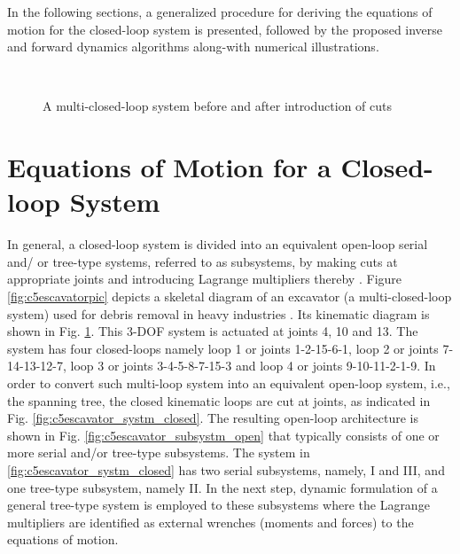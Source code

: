 In the following sections, a generalized procedure for deriving the equations of motion for the closed-loop system is presented, followed by the proposed inverse and forward dynamics algorithms along-with numerical illustrations.
\begin{figure}[t]
	\begin{center}
		\\ 
		 \hspace{1.5pt}
	\end{center}
	\caption{A multi-closed-loop system before and after introduction of cuts}
	\label{fig:c5cut_strategy}
\end{figure}
\section{Equations of Motion for a Closed-loop System}
\label{c5EOM}
In general, a closed-loop system is divided into an equivalent open-loop serial and/ or tree-type systems, referred to as subsystems, by making cuts at appropriate joints and introducing Lagrange multipliers thereby \citep{bae1987recursive,nikravesh1993systematic,blajer1994projective,shabana2013dynamics}. Figure \ref{fig:c5escavatorpic} depicts a skeletal diagram of an excavator (a multi-closed-loop system) used for debris removal in heavy industries \citep{janssen2005multiloop}. Its kinematic diagram is shown in Fig. \ref{fig:c5cut_strategy}. This 3-DOF system is actuated at joints 4, 10 and 13. The system has four closed-loops namely loop 1 or joints 1-2-15-6-1, loop 2 or joints 7-14-13-12-7, loop 3 or joints 3-4-5-8-7-15-3 and loop 4 or joints 9-10-11-2-1-9. In order to convert such multi-loop system into an equivalent open-loop system, i.e., the spanning tree, the closed kinematic loops are cut at joints, as indicated in Fig. \ref{fig:c5escavator_systm_closed}. The resulting open-loop architecture is shown in Fig. \ref{fig:c5escavator_subsystm_open} that typically consists of one or more serial and/or tree-type subsystems. The system in \ref{fig:c5escavator_systm_closed} has two serial subsystems, namely, I and III, and one tree-type subsystem, namely II. In the next step, dynamic formulation of a general tree-type system is employed to these subsystems where the Lagrange multipliers are identified as external wrenches (moments and forces) to the equations of motion.
